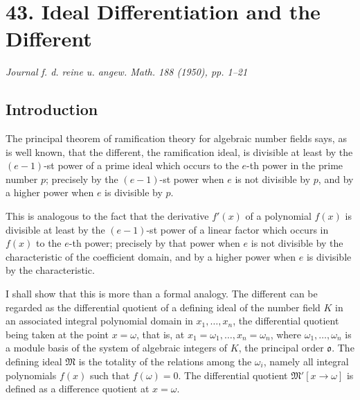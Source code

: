 \documentclass[11pt]{article}
\begin{document}
\clearpage

\section*{43. Ideal Differentiation and the Different}

\begin{center}
\emph{Journal f. d. reine u. angew. Math. 188 (1950), pp. 1--21}
\end{center}

\subsection*{Introduction}

The principal theorem of ramification theory for algebraic number fields says, as is well known, that the different, the ramification ideal, is divisible at least by the $(e-1)$-st power of a prime ideal which occurs to the $e$-th power in the prime number $p$; precisely by the $(e-1)$-st power when $e$ is not divisible by $p$, and by a higher power when $e$ is divisible by $p$.

This is analogous to the fact that the derivative $f'(x)$ of a polynomial $f(x)$ is divisible at least by the $(e-1)$-st power of a linear factor which occurs in $f(x)$ to the $e$-th power; precisely by that power when $e$ is not divisible by the characteristic of the coefficient domain, and by a higher power when $e$ is divisible by the characteristic.

I shall show that this is more than a formal analogy. The different can be regarded as the differential quotient of a defining ideal of the number field $K$ in an associated integral polynomial domain in $x_1,\ldots,x_n$, the differential quotient being taken at the point $x=\omega$, that is, at $x_1=\omega_1,\ldots,x_n=\omega_n$, where $\omega_1,\ldots,\omega_n$ is a module basis of the system of algebraic integers of $K$, the principal order $\mathfrak o$. The defining ideal $\mathfrak M$ is the totality of the relations among the $\omega_i$, namely all integral polynomials $f(x)$ such that $f(\omega)=0$. The differential quotient $\mathfrak M'[x\to\omega]$ is defined as a difference quotient at $x=\omega$.
\end{document}
